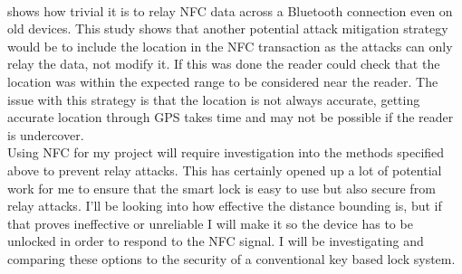 \documentclass[10pt, a4paper]{article}
\begin{document}
\\
\indent\cite{Francis2010} shows how trivial it is to relay NFC data across a Bluetooth connection even on old devices. This study shows that another potential attack mitigation strategy would be to include the location in the NFC transaction as the attacks can only relay the data, not modify it. If this was done the reader could check that the location was within the expected range to be considered near the reader. The issue with this strategy is that the location is not always accurate, getting accurate location through GPS takes time and may not be possible if the reader is undercover.
\\
\indent Using NFC for my project will require investigation into the methods specified above to prevent relay attacks. This has certainly opened up a lot of potential work for me to ensure that the smart lock is easy to use but also secure from relay attacks. I'll be looking into how effective the distance bounding is, but if that proves ineffective or unreliable I will make it so the device has to be unlocked in order to respond to the NFC signal. I will be investigating and comparing these options to the security of a conventional key based lock system.
\end{document}
